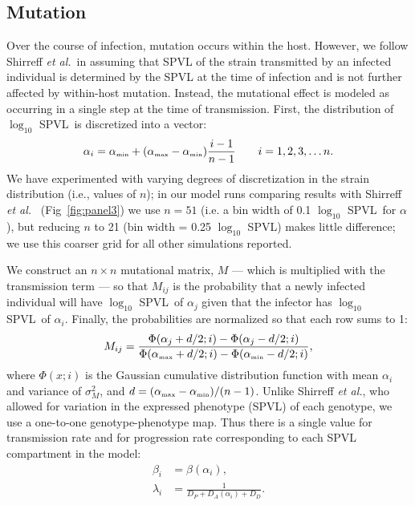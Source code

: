 \documentclass[10pt,letterpaper]{article}
\renewcommand{\figurename}{Fig}
\newcommand{\Lspvl}{$\log_{10}$ SPVL}
\newcommand{\etal}{\textit{et al.}}
\newcommand{\tsub}[2]{#1_{{\textrm{\tiny #2}}}}
\begin{document}
\subsection*{Mutation}

Over the course of infection, mutation occurs within the host. 
However, we follow Shirreff \etal\ in assuming that SPVL of the strain transmitted by an infected 
individual is determined by the SPVL at the time of infection and is not further affected by within-host mutation. 
Instead, the mutational effect is modeled as occurring in a single
step at the time of transmission. First, the distribution of \Lspvl\ is discretized into a vector:
\begin{equation}
\alpha_i = \tsub{\alpha}{min} + (\tsub{\alpha}{max} - \tsub{\alpha}{min})\frac{i-1}{n-1} \qquad i = 1,2,3, \dots n.
\end{equation}
We have experimented with varying degrees of discretization in the strain distribution (i.e., values of $n$); in our model runs comparing results with Shirreff \etal\ \cite{shirreff_transmission_2011} (\figurename~\ref{fig:panel3}) we use $n=51$ (i.e. a bin width of 0.1 \Lspvl\ for $\alpha$), but reducing $n$ to 21 (bin width = 0.25 \Lspvl) makes little difference; we use this coarser grid for all other simulations reported.

We construct an $n \times n$ mutational matrix, $M$ --- which is multiplied with the transmission term ---  so that $M_{ij}$ is the probability that a newly infected individual will have \Lspvl\ of $\alpha_j$ given that the infector has \Lspvl\ of $\alpha_i$. Finally, the probabilities are normalized so that each row sums to 1:
\begin{equation}
M_{ij} = \frac{\Phi(\alpha_j + d/2;i) - \Phi(\alpha_j - d/2;i)}{\Phi(\tsub{\alpha}{max} + d/2;i) - \Phi(\tsub{\alpha}{min} - d/2;i)},
\end{equation}
where $\Phi(x;i)$ is the Gaussian cumulative distribution function with mean $\alpha_i$ and variance of $\sigma_M^2$, and $d = (\tsub{\alpha}{max} - \tsub{\alpha}{min})/(n-1)$. 
Unlike Shirreff \etal, who allowed for variation in the expressed phenotype (SPVL) of each genotype,
we use a one-to-one genotype-phenotype map. Thus there is a single value for transmission rate and
for progression rate corresponding to each SPVL compartment in the model:
\begin{equation}
\begin{aligned}
\beta_i &= \beta(\alpha_i),\\
\lambda_i &= \frac{1}{D_P + D_A (\alpha_i) + D_D}.
\end{aligned}
\end{equation}
\end{document}
